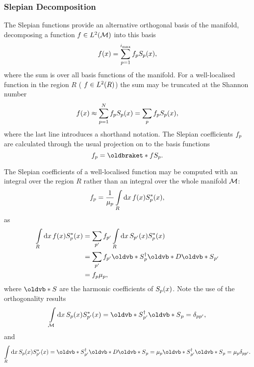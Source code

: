 \subsubsection{Slepian Decomposition}

The Slepian functions provide an alternative orthogonal basis of the manifold, decomposing a function \(f \in L^{2}(\mathcal{M})\) into this basis
%
\begin{equation}
	f(x)
	= \sum\limits_{p=1}^{i_{\text{max}}} {f}_{p} {S}_{p}(x),
\end{equation}
%
where the sum is over all basis functions of the manifold.
For a well-localised function in the region \(R\) (\ie{} \(f \in L^{2}(R)\)) the sum may be truncated at the Shannon number
%
\begin{equation}
	f(x)
	\approx \sum\limits_{p=1}^{N} {f}_{p} {S}_{p}(x)
	= \sum\limits_{p} {f}_{p} {S}_{p}(x),
\end{equation}
%
where the last line introduces a shorthand notation.
The Slepian coefficients \({f}_{p}\) are calculated through the usual projection on to the basis functions
%
\begin{equation}
	\slepian{f}
	= \braket{f}{\slepian{S}}.
\end{equation}

The Slepian coefficients of a well-localised function may be computed with an integral over the region \(R\) rather than an integral over the whole manifold \(\mathcal{M}{}\):
%
\begin{equation}
	{f}_{p}
	= \frac{1}{{\mu}_{p}} \int\limits_{R} \dd{x} f(x) {S}_{p}^{\ast}(x),
\end{equation}
%
as
%
\begin{align}
	\integrateRegion{\meshVolume} \mesh{f} \mesh{\conj{\slepian{S}}}
	 & = \slepianSum['] \slepian[']{f} \integrateRegion{\meshVolume} \mesh{\slepian[']{S}} \mesh{\conj{\slepian{S}}} \nonumber \\
	 & = \slepianSum['] \slepian[']{f} \hermitian{\slepian{\vb{S}}} \vb{D} \slepian[']{\vb{S}} \nonumber                       \\
	 & = \slepian{f} \slepian{\mu},
\end{align}
%
where \(\vb{S}\) are the harmonic coefficients of \({S}_{p}(x)\).
Note the use of the orthogonality results
%
\begin{equation}\label{eq:chapter4_orthogonality_manifold}
	\integrateManifold{x} \mesh{\slepian{S}} \mesh{\conj{\slepian[']{S}}}
	= \hermitian{\slepian[']{\vb{S}}} \slepian{\vb{S}}
	= \delta_{pp'},
\end{equation}
%
and
%
\begin{equation}
	\integrateRegion{\meshVolume} \mesh{\slepian{S}} \mesh{\conj{\slepian[']{S}}}
	= \hermitian{\slepian[']{\vb{S}}} \vb{D} \slepian{\vb{S}}
	= \slepian{\mu} \hermitian{\slepian[']{\vb{S}}} \slepian{\vb{S}}
	= \slepian{\mu} \delta_{pp'}.
\end{equation}

